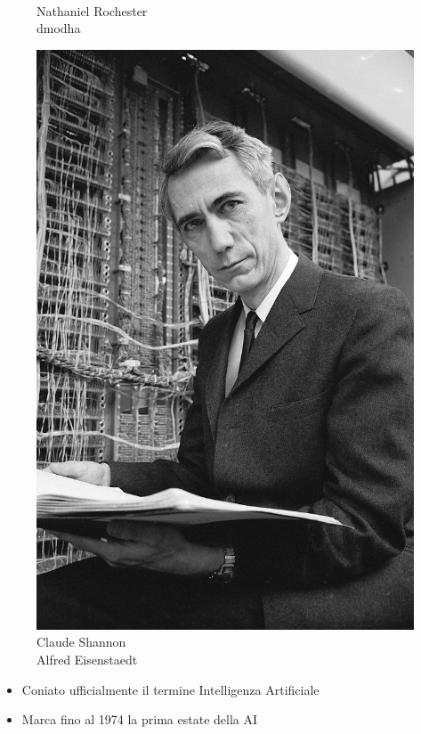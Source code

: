 \begin{frame}[t]
{\begin{minipage}[t]{\textwidth}
\begin{minipage}[t]{0.24\textwidth}
\begin{figure}[ht]
				{\tiny\\Nathaniel Rochester\\\textcopyright dmodha}
			\end{figure}
		\end{minipage}
		\begin{minipage}[t]{0.24\textwidth}
			\centering
			\begin{figure}[ht]
				\includegraphics[width=.6\textwidth]{img/Roberts-Claude-Shannon.png}
				{\tiny\\Claude Shannon\\\textcopyright Alfred Eisenstaedt}
			\end{figure}
		\end{minipage}
	\end{minipage}
    \begin{itemize}[leftmargin=10pt,align=right]
		\onslide<2->\item[\alert{\faHandORight}] Coniato ufficialmente il termine \alert{Intelligenza Artificiale}
		\onslide<3->\item[\alert{\faHandORight}] Marca fino al 1974 la \alert{prima estate della AI}
	\end{itemize}
}
\end{frame}
%
